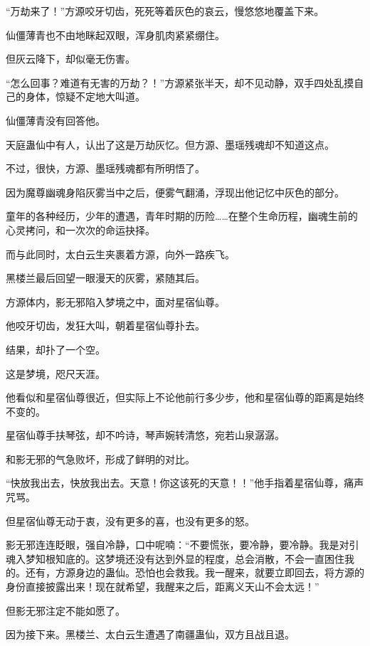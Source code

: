 
\begin{this_body}



“万劫来了！”方源咬牙切齿，死死等着灰色的哀云，慢悠悠地覆盖下来。

仙僵薄青也不由地眯起双眼，浑身肌肉紧紧绷住。

但灰云降下，却似毫无伤害。

“怎么回事？难道有无害的万劫？！”方源紧张半天，却不见动静，双手四处乱摸自己的身体，惊疑不定地大叫道。

仙僵薄青没有回答他。

天庭蛊仙中有人，认出了这是万劫灰忆。但方源、墨瑶残魂却不知道这点。

不过，很快，方源、墨瑶残魂都有所明悟了。

因为魔尊幽魂身陷灰雾当中之后，便雾气翻涌，浮现出他记忆中灰色的部分。

童年的各种经历，少年的遭遇，青年时期的历险……在整个生命历程，幽魂生前的心灵拷问，和一次次的命运抉择。

而与此同时，太白云生夹裹着方源，向外一路疾飞。

黑楼兰最后回望一眼漫天的灰雾，紧随其后。

方源体内，影无邪陷入梦境之中，面对星宿仙尊。

他咬牙切齿，发狂大叫，朝着星宿仙尊扑去。

结果，却扑了一个空。

这是梦境，咫尺天涯。

他看似和星宿仙尊很近，但实际上不论他前行多少步，他和星宿仙尊的距离是始终不变的。

星宿仙尊手扶琴弦，却不吟诗，琴声婉转清悠，宛若山泉潺潺。

和影无邪的气急败坏，形成了鲜明的对比。

“快放我出去，快放我出去。天意！你这该死的天意！！”他手指着星宿仙尊，痛声咒骂。

但星宿仙尊无动于衷，没有更多的喜，也没有更多的怒。

影无邪连连眨眼，强自冷静，口中呢喃：“不要慌张，要冷静，要冷静。我是对引魂入梦知根知底的。这梦境还没有达到外显的程度，总会消散，不会一直困住我的。还有，方源身边的蛊仙。恐怕也会救我。我一醒来，就要立即回去，将方源的身份直接披露出来！现在就希望，我醒来之后，距离义天山不会太远！”

但影无邪注定不能如愿了。

因为接下来。黑楼兰、太白云生遭遇了南疆蛊仙，双方且战且退。


\end{this_body}
